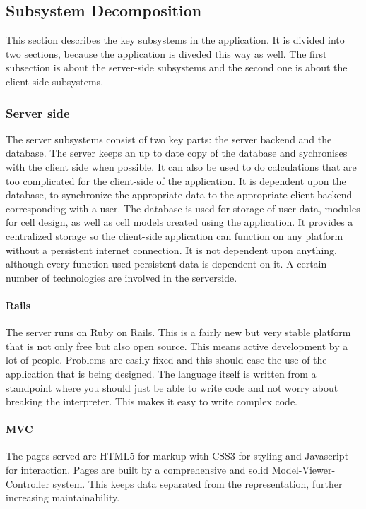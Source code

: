 \documentclass{report}
\begin{document}
		\subsection{Subsystem Decomposition}
			This section describes the key subsystems in the application. It is divided into two sections, because the application is diveded this way as well. The first subsection is about the server-side subsystems and the second one is about the client-side subsystems.
			\subsubsection{Server side}
				The server subsystems consist of two key parts: the server backend and the database. The server keeps an up to date copy of the database and sychronises with the client side when possible. It can also be used to do calculations that are too complicated for the client-side of the application. It is dependent upon the database, to synchronize the appropriate data to the appropriate client-backend corresponding with a user.
				The database is used for storage of user data, modules for cell design, as well as cell models created using the application. It provides a centralized storage so the client-side application can function on any platform without a persistent internet connection. It is not dependent upon anything, although every function used persistent data is dependent on it. 
				A certain number of technologies are involved in the serverside.
				\paragraph{Rails}
					The server runs on Ruby on Rails. This is a fairly new but very stable platform that is not only free but also open source. This means active development by a lot of people. Problems are easily fixed and this should ease the use of the application that is being designed. The language itself is written from a standpoint where you should just be able to write code and not worry about breaking the interpreter. This makes it easy to write complex code.
				\paragraph{MVC}
					The pages served are HTML5 for markup with CSS3 for styling and Javascript for interaction. Pages are built by a comprehensive and solid Model-Viewer-Controller system. This keeps data separated from the representation, further increasing maintainability. 
\end{document}
